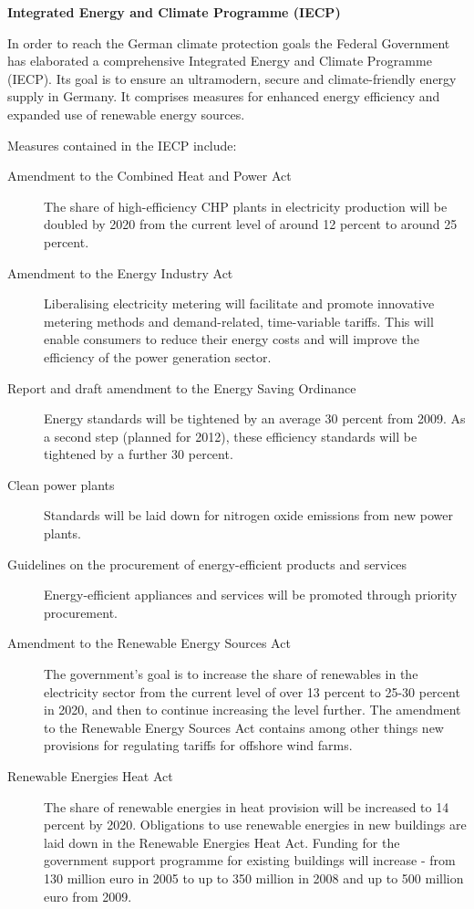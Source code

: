 \textbf{Integrated Energy and Climate Programme (IECP)}



In order to reach the German climate protection goals the Federal Government has elaborated a comprehensive Integrated Energy and Climate Programme (IECP). 
Its goal is to ensure an ultramodern, secure and climate-friendly energy supply in Germany. 
It comprises measures for enhanced energy efficiency and expanded use of renewable energy sources.



Measures contained in the IECP include:
\begin{description}
	\item[Amendment to the Combined Heat and Power Act] The share of high-efficiency CHP plants in electricity production will be doubled by 2020 from the current level of around 12 percent to around 25 percent.
	\item[Amendment to the Energy Industry Act] Liberalising electricity metering will facilitate and promote innovative metering methods and demand-related, time-variable tariffs. This will enable consumers to reduce their energy costs and will improve the efficiency of the power generation sector.
	\item[Report and draft amendment to the Energy Saving Ordinance] Energy standards will be tightened by an average 30 percent from 2009. As a second step (planned for 2012), these efficiency standards will be tightened by a further 30 percent.
	\item[Clean power plants] Standards will be laid down for nitrogen oxide emissions from new power plants.
	\item[Guidelines on the procurement of energy-efficient products and services] Energy-efficient appliances and services will be promoted through priority procurement.
	\item[Amendment to the Renewable Energy Sources Act] The government’s goal is to increase the share of renewables in the electricity sector from the current level of over 13 percent to 25-30 percent in 2020, and then to continue increasing the level further. The amendment to the Renewable Energy Sources Act contains among other things new provisions for regulating tariffs for offshore wind farms.
	\item[Renewable Energies Heat Act] The share of renewable energies in heat provision will be increased to 14 percent by 2020. Obligations to use renewable energies in new buildings are laid down in the Renewable Energies Heat Act. Funding for the government support programme for existing buildings will increase - from 130 million euro in 2005 to up to 350 million in 2008 and up to 500 million euro from 2009.

\end{description}
